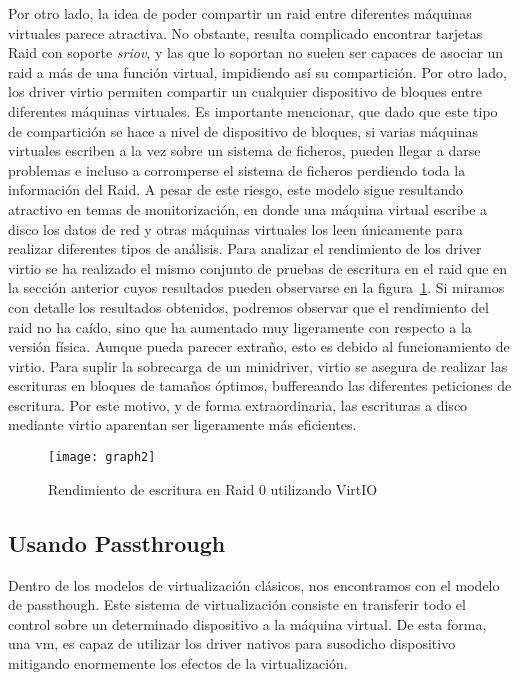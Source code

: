 Por otro lado, la idea de poder compartir un raid entre diferentes máquinas virtuales parece atractiva. No obstante, resulta complicado encontrar tarjetas Raid con soporte \textit{sriov}, y las que lo soportan no suelen ser capaces de asociar un raid a más de una función virtual, impidiendo así su compartición. Por otro lado, los driver \gls{virtio} permiten compartir un cualquier dispositivo de bloques entre diferentes máquinas virtuales. Es importante mencionar, que dado que este tipo de compartición se hace a nivel de dispositivo de bloques, si varias máquinas virtuales escriben a la vez sobre un sistema de ficheros, pueden llegar a darse problemas e incluso a corromperse el sistema de ficheros perdiendo toda la información del Raid. A pesar de este riesgo, este modelo sigue resultando atractivo en temas de monitorización, en donde una máquina virtual escribe a disco los datos de red y otras máquinas virtuales los leen únicamente para realizar diferentes tipos de análisis.
%
Para analizar el rendimiento de los driver \gls{virtio} se ha realizado el mismo conjunto de pruebas de escritura en el raid que en la sección anterior cuyos resultados pueden observarse en la figura~\ref{fig:vmfisica:graphdd2}.
Si miramos con detalle los resultados obtenidos, podremos observar que el rendimiento del raid no ha caído, sino que ha aumentado muy ligeramente con respecto a la versión física. Aunque pueda parecer extraño, esto es debido al funcionamiento de \gls{virtio}. Para suplir la sobrecarga de un minidriver, \gls{virtio} se asegura de realizar las escrituras en bloques de tamaños óptimos, buffereando las diferentes peticiones de escritura. Por este motivo, y de forma extraordinaria, las escrituras a disco mediante \gls{virtio} aparentan ser ligeramente más eficientes.

\begin{figure}[!htb]
\centering
\texttt{[image: graph2]}
\caption{Rendimiento de escritura en Raid 0 utilizando VirtIO}
\label{fig:vmfisica:graphdd2}
\end{figure}

\newpage
\subsection{Usando Passthrough\label{sec:pt}}

Dentro de los modelos de virtualización clásicos, nos encontramos con el modelo de \gls{passthough}. Este sistema de virtualización consiste en transferir todo el control sobre un determinado dispositivo a la máquina virtual. De esta forma, una \gls{vm}, es capaz de utilizar los driver nativos para susodicho dispositivo mitigando enormemente los efectos de la virtualización.

